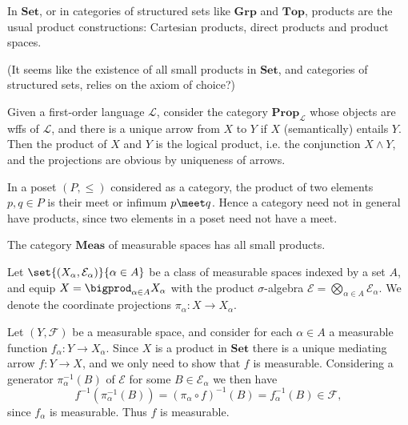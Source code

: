 \documentclass[article, a4paper, 11pt, oneside]{memoir}
\numberwithin{equation}{chapter}
\newcommand{\calL}{\mathcal{L}}
\newcommand{\calE}{\mathcal{E}}
\newcommand{\calF}{\mathcal{F}}
\newcommand{\ncat}[1]{\mathbf{#1}} %
\newcommand{\catSet}{\ncat{Set}}
\newcommand{\catTop}{\ncat{Top}}
\newcommand{\catGrp}{\ncat{Grp}}
\newcommand{\catProp}{\ncat{Prop}}
\newcommand{\catMeas}{\ncat{Meas}}
\theoremstyle{myexample}
\theoremstyle{myexamplebreak}
\begin{document}
\begin{examplebreak}
    \begin{enumexample}
        \item In $\catSet$, or in categories of structured sets like $\catGrp$ and $\catTop$, products are the usual product constructions: Cartesian products, direct products and product spaces.

        (It seems like the existence of all small products in $\catSet$, and categories of structured sets, relies on the axiom of choice?)
        
        \item Given a first-order language $\calL$, consider the category $\catProp_\calL$ whose objects are wffs of $\calL$, and there is a unique arrow from $X$ to $Y$ if $X$ (semantically) entails $Y$. Then the product of $X$ and $Y$ is the logical product, i.e. the conjunction $X \land Y$, and the projections are obvious by uniqueness of arrows.
        
        \item In a poset $(P, \leq)$ considered as a category, the product of two elements $p, q \in P$ is their meet or infimum $p \meet q$. Hence a category need not in general have products, since two elements in a poset need not have a meet.
        
        \item The category $\catMeas$ of measurable spaces has all small products.
        
        Let $\set{(X_\alpha, \calE_\alpha)}{\alpha \in A}$ be a class of measurable spaces indexed by a set $A$, and equip $X = \bigprod_{\alpha \in A} X_\alpha$ with the product $\sigma$-algebra $\calE = \bigotimes_{\alpha \in A} \calE_\alpha$. We denote the coordinate projections $\pi_\alpha \colon X \to X_\alpha$.
    
        Let $(Y, \calF)$ be a measurable space, and consider for each $\alpha \in A$ a measurable function $f_\alpha \colon Y \to X_\alpha$. Since $X$ is a product in $\catSet$ there is a unique mediating arrow $f \colon Y \to X$, and we only need to show that $f$ is measurable. Considering a generator $\pi_\alpha^{-1}(B)$ of $\calE$ for some $B \in \calE_\alpha$ we then have
        \begin{equation*}
            f^{-1}(\pi_\alpha^{-1}(B))
                = (\pi_\alpha \circ f)^{-1}(B)
                = f_\alpha^{-1}(B) \in \calF,
        \end{equation*}
        since $f_\alpha$ is measurable. Thus $f$ is measurable.
    \end{enumexample}
\end{examplebreak}
\end{document}
